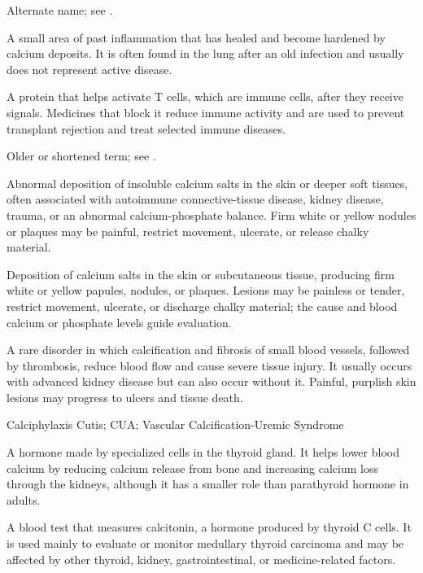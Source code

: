  Alternate name; see .

 A small area of past inflammation that has healed and become hardened by calcium deposits. It is often found in the lung after an old infection and usually does not represent active disease.

 A protein that helps activate T cells, which are immune cells, after they receive signals. Medicines that block it reduce immune activity and are used to prevent transplant rejection and treat selected immune diseases.

 Older or shortened term; see .

 Abnormal deposition of insoluble calcium salts in the skin or deeper soft tissues, often associated with autoimmune connective-tissue disease, kidney disease, trauma, or an abnormal calcium-phosphate balance. Firm white or yellow nodules or plaques may be painful, restrict movement, ulcerate, or release chalky material.

 Deposition of calcium salts in the skin or subcutaneous tissue, producing firm white or yellow papules, nodules, or plaques. Lesions may be painless or tender, restrict movement, ulcerate, or discharge chalky material; the cause and blood calcium or phosphate levels guide evaluation.

 A rare disorder in which calcification and fibrosis of small blood vessels, followed by thrombosis, reduce blood flow and cause severe tissue injury. It usually occurs with advanced kidney disease but can also occur without it. Painful, purplish skin lesions may progress to ulcers and tissue death.

\synonyms
Calciphylaxis Cutis; CUA; Vascular Calcification-Uremic Syndrome

 A hormone made by specialized cells in the thyroid gland. It helps lower blood calcium by reducing calcium release from bone and increasing calcium loss through the kidneys, although it has a smaller role than parathyroid hormone in adults.

 A blood test that measures calcitonin, a hormone produced by thyroid C cells. It is used mainly to evaluate or monitor medullary thyroid carcinoma and may be affected by other thyroid, kidney, gastrointestinal, or medicine-related factors.

